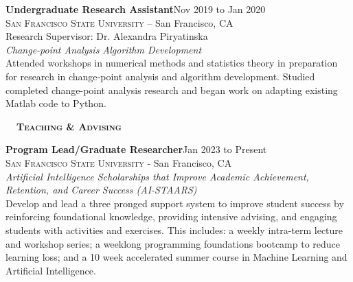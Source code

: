 \documentclass[hidelinks, 10.5pt]{article}
\def\contentwidth{0.9\linewidth}    %
\def\sectionspacing{8mm}            %
\def\sectiontocontentspacing{4mm}   %
\renewcommand{\section}[1]{
    {\fontsize{14}{14}\selectfont \textsc{\textbf{\ \ #1\ \ }}}\hrulefill
}
\begin{document}
{{    \begin{minipage}[ct]{\contentwidth}
        \textbf{Undergraduate Research Assistant}\hfill Nov 2019 to Jan 2020\\
        \textsc{San Francisco State University} -- San Francisco, CA\\
        Research Supervisor: Dr. Alexandra Piryatinska\vspace{1mm}\\
        {\textit{Change-point Analysis Algorithm Development}}\\
        Attended workshops in numerical methods and statistics theory in preparation for research in change-point analysis and algorithm
        development.  Studied completed change-point analysis research and began work on adapting existing Matlab code to Python.
    \end{minipage}
}

\vspace{\sectionspacing}


\section{Teaching \& Advising}

\vspace{\sectiontocontentspacing}

\begin{minipage}[ct]{\contentwidth}
    \textbf{Program Lead/Graduate Researcher}\hfill Jan 2023 to Present\\
    {\textsc{San Francisco State University} - San Francisco, CA}\\
    \textit{Artificial Intelligence Scholarships that Improve Academic Achievement, Retention, and Career Success (AI-STAARS)}\\
    Develop and lead a three pronged support system to improve student success by reinforcing foundational knowledge, providing intensive
    advising, and engaging students with activities and exercises. This includes: a weekly intra-term lecture and workshop series; a weeklong
    programming foundations bootcamp to reduce learning loss; and a 10 week accelerated summer course in Machine Learning and
    Artificial Intelligence.
\end{minipage}

}
\end{document}
